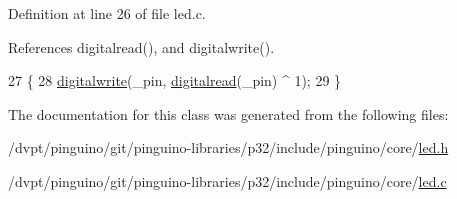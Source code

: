 Definition at line 26 of file led.\-c.



References digitalread(), and digitalwrite().


\begin{DoxyCode}
27 \{
28     \hyperlink{p8_2pinguino_2core_2digitalw_8c_aa8b647552ab4292b55b14ab37b166908}{digitalwrite}(\_pin, \hyperlink{digitalr_8c_a2800a13f4516530f5055b7348d83bdf5}{digitalread}(\_pin) ^ 1);
29 \}
\end{DoxyCode}


The documentation for this class was generated from the following files\-:\begin{DoxyCompactItemize}
\item 
/dvpt/pinguino/git/pinguino-\/libraries/p32/include/pinguino/core/\hyperlink{led_8h}{led.\-h}\item 
/dvpt/pinguino/git/pinguino-\/libraries/p32/include/pinguino/core/\hyperlink{led_8c}{led.\-c}\end{DoxyCompactItemize}
